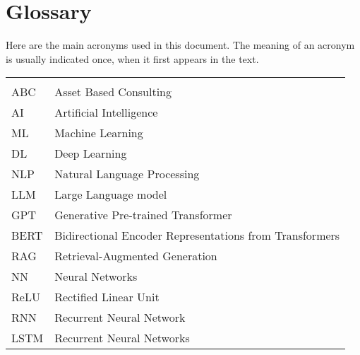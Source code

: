 \chapter*{Glossary}

Here are the main acronyms used in this document. The meaning of an acronym is usually indicated once, when it first appears in the text.

\begin{longtable}{lp{9cm}}
         &                                                         \\
    ABC  & Asset Based Consulting                                  \\
    AI   & Artificial Intelligence                                 \\
    ML   & Machine Learning                                        \\
    DL   & Deep Learning                                           \\
    NLP  & Natural Language Processing                             \\
    LLM  & Large Language model                                    \\
    GPT  & Generative Pre-trained Transformer                      \\
    BERT & Bidirectional Encoder Representations from Transformers \\
    RAG  & Retrieval-Augmented Generation                          \\
    NN   & Neural Networks                                         \\
    ReLU & Rectified Linear Unit                                   \\
    RNN  & Recurrent Neural Network                                \\
    LSTM & Recurrent Neural Networks                               \\
\end{longtable}

